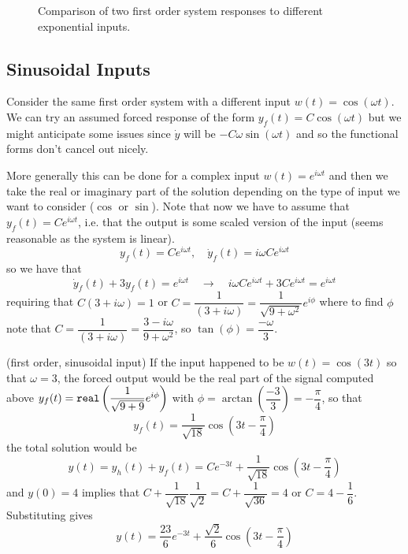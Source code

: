 \documentclass[12pt]{article}
\begin{document}
\begin{figure}[h]
\def\tm{3}
{\centering 
{}   }
\caption{Comparison of two first order system responses to different exponential inputs.}
\end{figure}

\subsection{Sinusoidal Inputs}
Consider the same first order system with a different input $w(t) = \cos(\omega t)$. 
We can try an assumed forced response of the form
$y_f(t) = C \cos(\omega t)$ but we might anticipate some issues since $\dot y$ will be $-C \omega \sin(\omega t)$ and so the functional forms don't cancel out nicely.

More generally this can be done for a complex input $w(t) = e^{i \omega t}$ and then we take the real or imaginary part of the solution depending on the type of input we want to consider ($\cos$ or $\sin$). Note that now we have to assume that 
$y_f(t) = C e^{i \omega t}$, i.e. that the output is some scaled version of the input (seems reasonable as the system is linear).
$$
y_f(t) = C e^{i \omega t}, \quad \dot y_f(t) = i\omega C e^{i \omega t}
$$
so we have that 
$$
\dot y_f(t) + 3 y_f(t) =  e^{i \omega t} \quad \to \quad i\omega C e^{i \omega t} + 3 C e^{i \omega t} = e^{i \omega t}
$$
requiring that $C (3 + i\omega) = 1$ or $C=\dfrac{1}{(3 + i \omega)} = \dfrac{1}{\sqrt{9 + \omega^2}}e^{i\phi}$ where to find $\phi$ note that
$C=\dfrac{1}{(3 + i \omega)} = \dfrac{3 - i \omega}{9 + \omega^2}$, so $\tan(\phi) = \dfrac{-\omega}{3}$.

\begin{example} (first order, sinusoidal input) If the input happened to be $w(t) = \cos(3t)$ so that $\omega = 3$, the forced output would be the real part of the signal computed above $y_f(t)={\tt real}\left(\dfrac{1}{\sqrt{9+9}}e^{i\phi}\right)$ with $\phi = \arctan\left(\dfrac{-3}{3}\right) = -\dfrac{\pi}{4}$, so that
$$
y_f(t) = \dfrac{1}{\sqrt{18}} \cos\left(3t -\dfrac{\pi}{4}\right)
$$
the total solution would be 
$$
y(t) = y_h(t) + y_f(t) = C e^{-3t} + \dfrac{1}{\sqrt{18}} \cos\left(3t -\dfrac{\pi}{4}\right)
$$
and $y(0)=4$ implies that $C + \dfrac{1}{\sqrt{18}}\dfrac{1}{\sqrt{2}} = C + \dfrac{1}{\sqrt{36}}=4$ or $C=4-\dfrac{1}{6}$. Substituting gives
$$
y(t) = \dfrac{23}{6} e^{-3t} + \dfrac{\sqrt{2}}{6} \cos\left(3t -\dfrac{\pi}{4}\right)
$$
\end{example}
\end{document}
